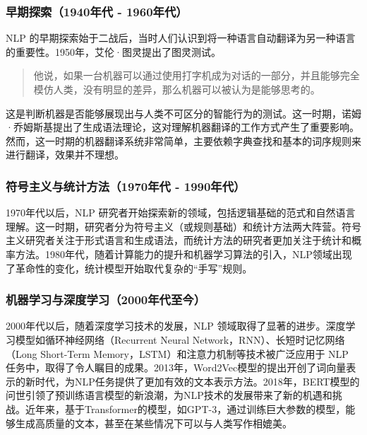 \documentclass[
]{article}
\begin{document}
\subsubsection{早期探索（1940年代 -
1960年代）}\label{ux65e9ux671fux63a2ux7d221940ux5e74ux4ee3---1960ux5e74ux4ee3}

NLP
的早期探索始于二战后，当时人们认识到将一种语言自动翻译为另一种语言的重要性。1950年，艾伦·图灵提出了图灵测试。

\begin{quote}
他说，如果一台机器可以通过使用打字机成为对话的一部分，并且能够完全模仿人类，没有明显的差异，那么机器可以被认为是能够思考的。
\end{quote}

这是判断机器是否能够展现出与人类不可区分的智能行为的测试。这一时期，诺姆·乔姆斯基提出了生成语法理论，这对理解机器翻译的工作方式产生了重要影响。然而，这一时期的机器翻译系统非常简单，主要依赖字典查找和基本的词序规则来进行翻译，效果并不理想。

\subsubsection{符号主义与统计方法（1970年代 -
1990年代）}\label{ux7b26ux53f7ux4e3bux4e49ux4e0eux7edfux8ba1ux65b9ux6cd51970ux5e74ux4ee3---1990ux5e74ux4ee3}

1970年代以后，NLP
研究者开始探索新的领域，包括逻辑基础的范式和自然语言理解。这一时期，研究者分为符号主义（或规则基础）和统计方法两大阵营。符号主义研究者关注于形式语言和生成语法，而统计方法的研究者更加关注于统计和概率方法。1980年代，随着计算能力的提升和机器学习算法的引入，NLP领域出现了革命性的变化，统计模型开始取代复杂的``手写''规则。

\subsubsection{机器学习与深度学习（2000年代至今）}\label{ux673aux5668ux5b66ux4e60ux4e0eux6df1ux5ea6ux5b66ux4e602000ux5e74ux4ee3ux81f3ux4eca}

2000年代以后，随着深度学习技术的发展，NLP
领域取得了显著的进步。深度学习模型如循环神经网络（Recurrent Neural
Network，RNN）、长短时记忆网络（Long Short-Term
Memory，LSTM）和注意力机制等技术被广泛应用于 NLP
任务中，取得了令人瞩目的成果。2013年，Word2Vec模型的提出开创了词向量表示的新时代，为NLP任务提供了更加有效的文本表示方法。2018年，BERT模型的问世引领了预训练语言模型的新浪潮，为NLP技术的发展带来了新的机遇和挑战。近年来，基于Transformer的模型，如GPT-3，通过训练巨大参数的模型，能够生成高质量的文本，甚至在某些情况下可以与人类写作相媲美。
\end{document}

